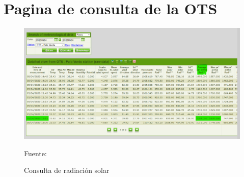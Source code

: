 \chapter{Pagina de consulta de la OTS}

\begin{figure}[H]
\centering
\includegraphics[scale=0.48]{Figuras/radiacion.png}
\caption{Consulta de radiación solar }
Fuente:\cite{ots}
\label{anexo9}
\end{figure}